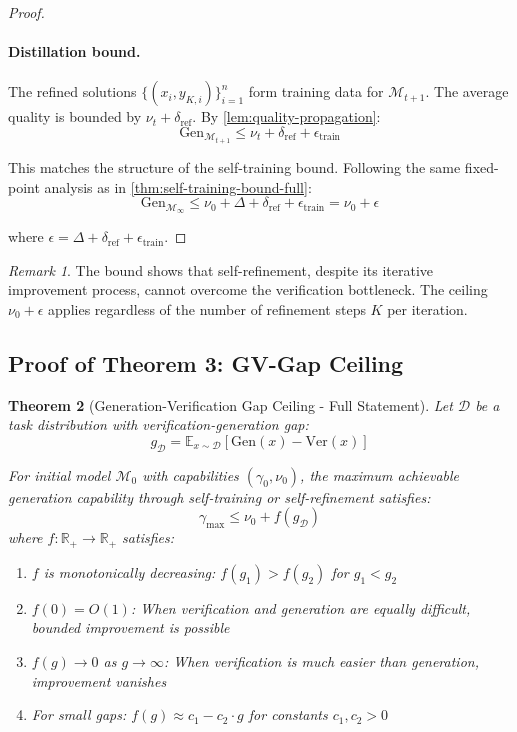 \documentclass{article}
\newtheorem{theorem}{Theorem}
\theoremstyle{definition}
\theoremstyle{remark}
\newtheorem{remark}[theorem]{Remark}
\newcommand{\M}{\mathcal{M}}
\newcommand{\D}{\mathcal{D}}
\newcommand{\Gen}{\text{Gen}}
\newcommand{\Ver}{\text{Ver}}
\newcommand{\E}{\mathbb{E}}
\newcommand{\R}{\mathbb{R}}
\begin{document}
\begin{proof}
\paragraph{Distillation bound.}
The refined solutions \(\{(x_i, y_{K,i})\}_{i=1}^n\) form training data for \(\M_{t+1}\). The average quality is bounded by \(\nu_t + \delta_{\text{ref}}\). By \cref{lem:quality-propagation}:
\[
\Gen_{\M_{t+1}} \leq \nu_t + \delta_{\text{ref}} + \epsilon_{\text{train}}
\]

This matches the structure of the self-training bound. Following the same fixed-point analysis as in \cref{thm:self-training-bound-full}:
\[
\Gen_{\M_\infty} \leq \nu_0 + \Delta + \delta_{\text{ref}} + \epsilon_{\text{train}} = \nu_0 + \epsilon
\]

where \(\epsilon = \Delta + \delta_{\text{ref}} + \epsilon_{\text{train}}\).
\end{proof}

\begin{remark}
The bound shows that self-refinement, despite its iterative improvement process, cannot overcome the verification bottleneck. The ceiling \(\nu_0 + \epsilon\) applies regardless of the number of refinement steps \(K\) per iteration.
\end{remark}

\subsection{Proof of Theorem 3: GV-Gap Ceiling}

\begin{theorem}[Generation-Verification Gap Ceiling - Full Statement]
\label{thm:gv-gap-full}
Let \(\D\) be a task distribution with verification-generation gap:
\[
g_\D = \E_{x \sim \D}[\Gen(x) - \Ver(x)]
\]

For initial model \(\M_0\) with capabilities \((\gamma_0, \nu_0)\), the maximum achievable generation capability through self-training or self-refinement satisfies:
\[
\gamma_{\max} \leq \nu_0 + f(g_\D)
\]
where \(f : \R_+ \to \R_+\) satisfies:
\begin{enumerate}
\item \(f\) is monotonically decreasing: \(f(g_1) > f(g_2)\) for \(g_1 < g_2\)
\item \(f(0) = O(1)\): When verification and generation are equally difficult, bounded improvement is possible
\item \(f(g) \to 0\) as \(g \to \infty\): When verification is much easier than generation, improvement vanishes
\item For small gaps: \(f(g) \approx c_1 - c_2 \cdot g\) for constants \(c_1, c_2 > 0\)
\end{enumerate}
\end{theorem}
\end{document}
